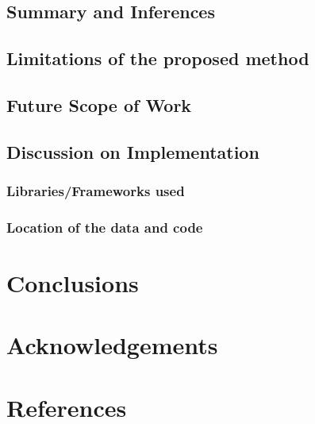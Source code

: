 \documentclass[manuscript,screen,nonacm,11pt]{acmart}
\numberwithin{equation}{section}
\begin{document}
\subsection{Summary and Inferences}
\subsection{Limitations of the proposed method}
\subsection{Future Scope of Work}
\subsection{Discussion on Implementation}
\subsubsection{Libraries/Frameworks used}
\subsubsection{Location of the data and code} 

\section{Conclusions}
\label{sec:concl}

\section*{Acknowledgements}

\section*{References}
\begin{thebibliography}{10}
\end{thebibliography}
\end{document}
